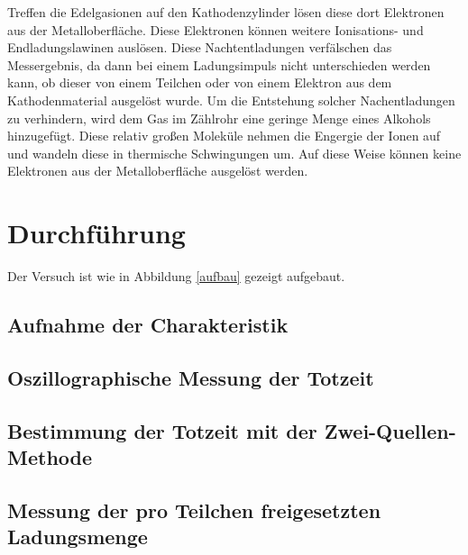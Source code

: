 \documentclass[11pt,ngerman,a4paper]{article}
\begin{document}
\noindent
Treffen die Edelgasionen auf den Kathodenzylinder lösen diese dort Elektronen aus der Metalloberfläche. Diese Elektronen können weitere Ionisations- und Endladungslawinen auslösen. Diese Nachtentladungen verfälschen das Messergebnis, da dann bei einem Ladungsimpuls nicht unterschieden werden kann, ob dieser von einem Teilchen oder von einem Elektron aus dem Kathodenmaterial ausgelöst wurde. Um die Entstehung solcher Nachentladungen zu verhindern, wird dem Gas im Zählrohr eine geringe Menge eines Alkohols hinzugefügt. Diese relativ großen Moleküle nehmen die Engergie der Ionen auf und wandeln diese in thermische Schwingungen um. Auf diese Weise können keine Elektronen aus der Metalloberfläche ausgelöst werden.
\section{Durchführung}
Der Versuch ist wie in Abbildung \ref{aufbau} gezeigt aufgebaut. 
\subsection{Aufnahme der Charakteristik}
\subsection{Oszillographische Messung der Totzeit}
\subsection{Bestimmung der Totzeit mit der Zwei-Quellen-Methode}
\subsection{Messung der pro Teilchen freigesetzten Ladungsmenge}
\end{document}
